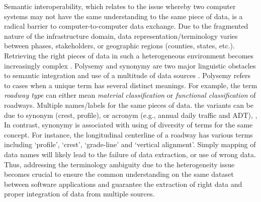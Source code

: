 \documentclass[Journal, BackFigs, DoubleSpace]{ascelike} %
\begin{document}
Semantic interoperability, which relates to the issue whereby two computer systems may not have the same understanding to the same piece of data, is a radical barrier to computer-to-computer data exchange. Due to the fragmented nature of the infrastructure domain, data representation/terminology varies between phases, stakeholders, or geographic regions (counties, states, etc.). Retrieving the right pieces of data in such a heterogeneous environment becomes increasingly complex \cite{karimi2003semantic}. Polysemy and synonymy are two major linguistic obstacles to semantic integration and use of a multitude of data sources \cite{noy04}. Polysemy refers to cases when a unique term has several distinct meanings. For example, the term \textit{roadway type} can either mean \textit{material classification} or \textit{functional classification} of roadways. Multiple names/labels for the same pieces of data. the variants can be due to synonym (crest, profile), or acronym (e.g., annual daily traffic and ADT), , In contrast, synonymy is associated with using of diversity of terms for the same concept. For instance, the longitudinal centerline of a roadway has various terms including `profile', `crest', `grade-line' and `vertical alignment'. Simply mapping of data names will likely lead to the failure of data extraction, or use of wrong data. Thus, addressing the terminology ambiguity due to the heterogeneity  issue becomes crucial to ensure the common understanding on the same dataset between software applications and guarantee the extraction of right data and proper integration of data from multiple sources. 
\par
\end{document}
